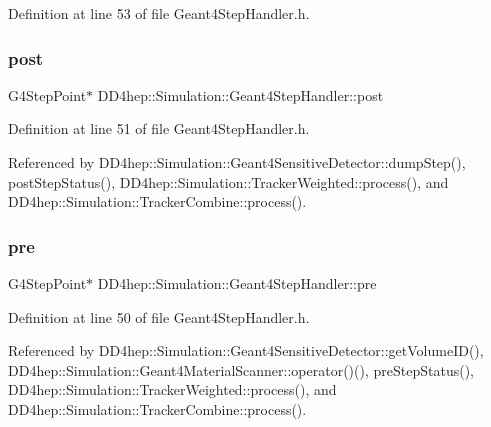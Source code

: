 Definition at line 53 of file Geant4\+Step\+Handler.\+h.

\hypertarget{class_d_d4hep_1_1_simulation_1_1_geant4_step_handler_aed9081f8334e95c40e321c14621c0a35}{}\label{class_d_d4hep_1_1_simulation_1_1_geant4_step_handler_aed9081f8334e95c40e321c14621c0a35} 
\subsubsection{\texorpdfstring{post}{post}}
{\footnotesize\ttfamily G4\+Step\+Point$\ast$ D\+D4hep\+::\+Simulation\+::\+Geant4\+Step\+Handler\+::post}



Definition at line 51 of file Geant4\+Step\+Handler.\+h.



Referenced by D\+D4hep\+::\+Simulation\+::\+Geant4\+Sensitive\+Detector\+::dump\+Step(), post\+Step\+Status(), D\+D4hep\+::\+Simulation\+::\+Tracker\+Weighted\+::process(), and D\+D4hep\+::\+Simulation\+::\+Tracker\+Combine\+::process().

\hypertarget{class_d_d4hep_1_1_simulation_1_1_geant4_step_handler_a7c18f2d6e46ecbb380fbe0995029accb}{}\label{class_d_d4hep_1_1_simulation_1_1_geant4_step_handler_a7c18f2d6e46ecbb380fbe0995029accb} 
\subsubsection{\texorpdfstring{pre}{pre}}
{\footnotesize\ttfamily G4\+Step\+Point$\ast$ D\+D4hep\+::\+Simulation\+::\+Geant4\+Step\+Handler\+::pre}



Definition at line 50 of file Geant4\+Step\+Handler.\+h.



Referenced by D\+D4hep\+::\+Simulation\+::\+Geant4\+Sensitive\+Detector\+::get\+Volume\+I\+D(), D\+D4hep\+::\+Simulation\+::\+Geant4\+Material\+Scanner\+::operator()(), pre\+Step\+Status(), D\+D4hep\+::\+Simulation\+::\+Tracker\+Weighted\+::process(), and D\+D4hep\+::\+Simulation\+::\+Tracker\+Combine\+::process().

